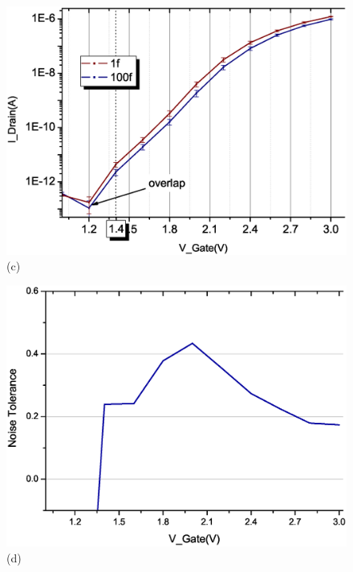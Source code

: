 \begin{figure}[!hbt]
\begin{minipage}[t][20cm][t]{1\textwidth}
        \begin{minipage}[t]{0.5\textwidth}
            \centering
            \includegraphics[scale=0.3]{images/chapter3/208_devices/L2-8_log.eps}
            (c)
        \end{minipage}
        \hfill
        \begin{minipage}[t]{0.5\textwidth}
            \raggedleft
            \includegraphics[scale=0.3]{images/chapter3/208_devices/L2-8_margin.eps}
            \centering
            (d)
        \end{minipage}
        \vfill
        \begin{minipage}[t]{0.5\textwidth}
            \centering

\end{minipage}
\end{minipage}
\end{figure}
